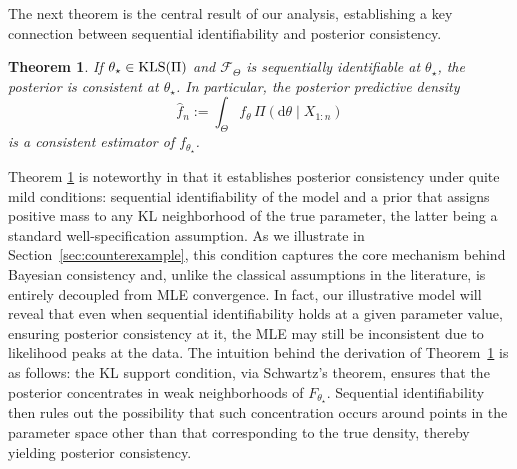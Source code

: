 \documentclass[11pt,twoside]{article}
\newtheorem{theorem}{Theorem}
\begin{document}
The next theorem is the central result of our analysis, establishing a key connection between sequential identifiability and posterior consistency.

\begin{theorem}\label{thm:general_parametric_consistency}
    If $\theta_\star\in\textnormal{KLS}(\Pi)$ and $\mathcal F_\Theta$ is sequentially identifiable at $\theta_\star$, the posterior is consistent at $\theta_\star$. In particular, the posterior predictive density
    $$\hat f_n:= \int_\Theta f_\theta\, \Pi(\mathrm d\theta\mid X_{1:n})$$
    is a consistent estimator of $f_{\theta_\star}$.
\end{theorem}

Theorem \ref{thm:general_parametric_consistency} is noteworthy in that it establishes posterior consistency under quite mild conditions: sequential identifiability of the model and a prior that assigns positive mass to any KL neighborhood of the true parameter, the latter being a standard well-specification assumption. As we illustrate in Section~\ref{sec:counterexample}, this condition captures the core mechanism behind Bayesian consistency and, unlike the classical assumptions in the literature, is entirely decoupled from MLE convergence. In fact, our illustrative model will reveal that even when sequential identifiability holds at a given parameter value, ensuring posterior consistency at it, the MLE may still be inconsistent due to likelihood peaks at the data. The intuition behind the derivation of Theorem~\ref{thm:general_parametric_consistency} is as follows: the KL support condition, via Schwartz’s theorem, ensures that the posterior concentrates in weak neighborhoods of $F_{\theta_\star}$. Sequential identifiability then rules out the possibility that such concentration occurs around points in the parameter space other than that corresponding to the true density, thereby yielding posterior consistency.
\end{document}
